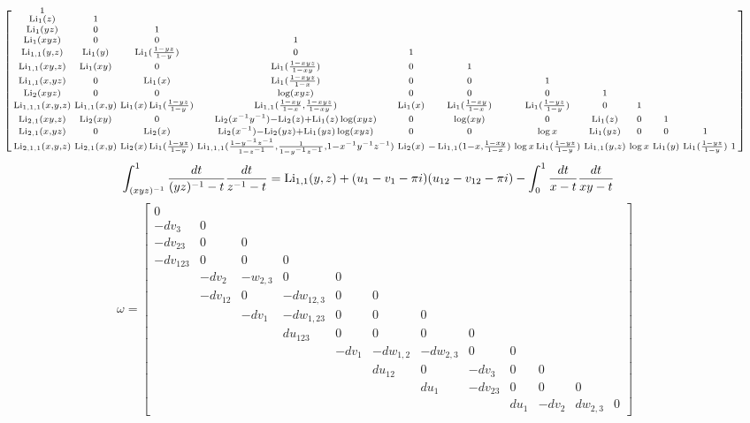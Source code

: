 \documentclass[main]{subfiles}
\begin{document}
\[\left[\begin{smallmatrix}
1\\
\operatorname{Li}_{1}(z)&1\\
\operatorname{Li}_{1}(yz)&0&1\\
\operatorname{Li}_{1}(xyz)&0&0&1\\
\operatorname{Li}_{1,1}(y,z)&\operatorname{Li}_1(y)&\operatorname{Li}_1(\frac{1-yz}{1-y})&0&1\\
\operatorname{Li}_{1,1}(xy,z)&\operatorname{Li}_1(xy)&0&\operatorname{Li}_1(\frac{1-xyz}{1-xy})&0&1\\
\operatorname{Li}_{1,1}(x,yz)&0&\operatorname{Li}_1(x)&\operatorname{Li}_1(\frac{1-xyz}{1-x})&0&0&1\\
\operatorname{Li}_{2}(xyz)&0&0&\log(xyz)&0&0&0&1\\
\operatorname{Li}_{1,1,1}(x,y,z)&\operatorname{Li}_{1,1}(x,y)&\operatorname{Li}_1(x)\operatorname{Li}_1(\frac{1-yz}{1-y})&\operatorname{Li}_{1,1}(\frac{1-xy}{1-x},\frac{1-xyz}{1-xy})&\operatorname{Li}_1(x)&\operatorname{Li}_1(\frac{1-xy}{1-x})&\operatorname{Li}_1(\frac{1-yz}{1-y})&0&1\\
\operatorname{Li}_{2,1}(xy,z)&\operatorname{Li}_2(xy)&0&\operatorname{Li}_2(x^{-1}y^{-1})-\operatorname{Li}_2(z)+\operatorname{Li}_1(z)\log(xyz)&0&\log(xy)&0&\operatorname{Li}_1(z)&0&1\\
\operatorname{Li}_{2,1}(x,yz)&0&\operatorname{Li}_2(x)&\operatorname{Li}_2(x^{-1})-\operatorname{Li}_2(yz)+\operatorname{Li}_1(yz)\log(xyz)&0&0&\log x&\operatorname{Li}_1(yz)&0&0&1\\
\operatorname{Li}_{2,1,1}(x,y,z)&\operatorname{Li}_{2,1}(x,y)&\operatorname{Li}_2(x)\operatorname{Li}_1(\frac{1-yz}{1-y})&\operatorname{Li}_{1,1,1}(\frac{1-y^{-1}z^{-1}}{1-z^{-1}},\frac{1}{1-y^{-1}z^{-1}},1-x^{-1}y^{-1}z^{-1})&\operatorname{Li}_2(x)&-\operatorname{Li}_{1,1}(1-x,\frac{1-xy}{1-x})&\log x\operatorname{Li}_1(\frac{1-yz}{1-y})&\operatorname{Li}_{1,1}(y,z)&\log x &\operatorname{Li}_1(y)&\operatorname{Li}_1(\frac{1-yz}{1-y})&1
\end{smallmatrix}\right]\]
\begin{align*}
\int_{(xyz)^{-1}}^1\frac{dt}{(yz)^{-1}-t}\frac{dt}{z^{-1}-t}&=\operatorname{Li}_{1,1}(y,z)+(u_1-v_1-\pi i)(u_{12}-v_{12}-\pi i)-\int_0^1\frac{dt}{x-t}\frac{dt}{xy-t}
\end{align*}
\[\omega=\left[\begin{smallmatrix}
0\\
-dv_3&0\\
-dv_{23}&0&0\\
-dv_{123}&0&0&0\\
&-dv_2&-w_{2,3}&0&0\\
&-dv_{12}&0&-dw_{12,3}&0&0\\
&&-dv_1&-dw_{1,23}&0&0&0\\
&&&du_{123}&0&0&0&0\\
&&&&-dv_1&-dw_{1,2}&-dw_{2,3}&0&0\\
&&&&&du_{12}&0&-dv_3&0&0\\
&&&&&&du_1&-dv_{23}&0&0&0\\
&&&&&&&&du_1&-dv_2&dw_{2,3}&0
\end{smallmatrix}\right]\]
\end{document}
